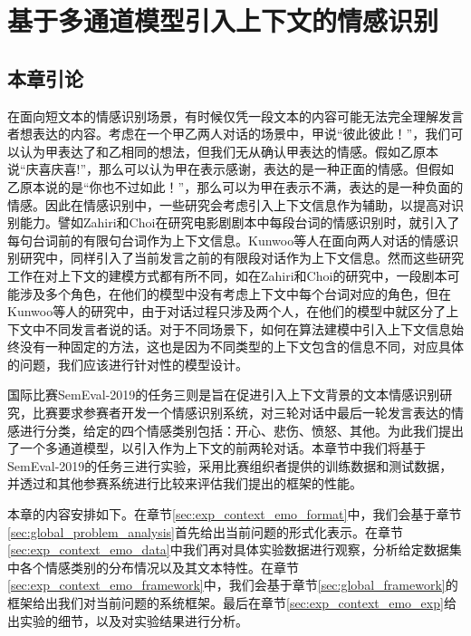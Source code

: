 \chapter{基于多通道模型引入上下文的情感识别}
\label{cha:exp_context_emo}

\section{本章引论}

在面向短文本的情感识别场景，有时候仅凭一段文本的内容可能无法完全理解发言者想表达的内容。考虑在一个甲乙两人对话的场景中，甲说“彼此彼此！”，我们可以认为甲表达了和乙相同的想法，但我们无从确认甲表达的情感。假如乙原本说“庆喜庆喜!”，那么可以认为甲在表示感谢，表达的是一种正面的情感。但假如乙原本说的是“你也不过如此！”，那么可以为甲在表示不满，表达的是一种负面的情感。因此在情感识别中，一些研究会考虑引入上下文信息作为辅助，以提高对识别能力。譬如Zahiri和Choi\cite{Zahiri2017Emotion}在研究电影剧剧本中每段台词的情感识别时，就引入了每句台词前的有限句台词作为上下文信息。Kunwoo等人\cite{hazarika2018conversational}在面向两人对话的情感识别研究中，同样引入了当前发言之前的有限段对话作为上下文信息。然而这些研究工作在对上下文的建模方式都有所不同，如在Zahiri和Choi\cite{Zahiri2017Emotion}的研究中，一段剧本可能涉及多个角色，在他们的模型中没有考虑上下文中每个台词对应的角色，但在Kunwoo等人\cite{hazarika2018conversational}的研究中，由于对话过程只涉及两个人，在他们的模型中就区分了上下文中不同发言者说的话。对于不同场景下，如何在算法建模中引入上下文信息始终没有一种固定的方法，这也是因为不同类型的上下文包含的信息不同，对应具体的问题，我们应该进行针对性的模型设计。

国际比赛SemEval-2019的任务三\cite{SemEval2019Task3}则是旨在促进引入上下文背景的文本情感识别研究，比赛要求参赛者开发一个情感识别系统，对三轮对话中最后一轮发言表达的情感进行分类，给定的四个情感类别包括：开心、悲伤、愤怒、其他。为此我们提出了一个多通道模型，以引入作为上下文的前两轮对话。本章节中我们将基于SemEval-2019的任务三进行实验，采用比赛组织者提供的训练数据和测试数据，并透过和其他参赛系统进行比较来评估我们提出的框架的性能。

本章的内容安排如下。在章节\ref{sec:exp_context_emo_format}中，我们会基于章节\ref{sec:global_problem_analysis}首先给出当前问题的形式化表示。在章节\ref{sec:exp_context_emo_data}中我们再对具体实验数据进行观察，分析给定数据集中各个情感类别的分布情况以及其文本特性。在章节\ref{sec:exp_context_emo_framework}中，我们会基于章节\ref{sec:global_framework}的框架给出我们对当前问题的系统框架。最后在章节\ref{sec:exp_context_emo_exp}给出实验的细节，以及对实验结果进行分析。

